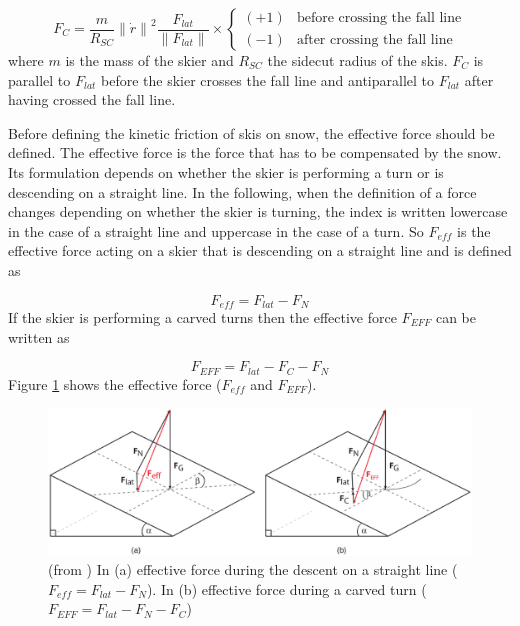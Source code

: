\documentclass[12pt,a4paper,twoside]{book}
\newcommand{\norm}[1]{\lVert#1\rVert}
\begin{document}
\begin{equation}
F_C=\frac{m}{R_{SC}} {\norm{\dot{r}}}^2 \frac{F_{lat}}{\norm{F_{lat}}} \times
\begin{cases}
  (+1) & \text{before crossing the fall line} \\
  (-1) & \text{after crossing the fall line}
  \end{cases}
\end{equation}
where $m$ is the mass of the skier and $R_{SC}$ the sidecut radius of the skis. $F_C$ is parallel to $F_{lat}$ before the skier crosses the fall line and antiparallel to $F_{lat}$ after having crossed the fall line.

Before defining the kinetic friction of skis on snow, the effective force should be defined. The effective force is the force that has to be compensated by the snow. Its formulation depends on whether the skier is performing a turn or is descending on a straight line. In the following, when the definition of a force changes depending on whether the skier is turning, the index is written lowercase in the case of a straight line and uppercase in the case of a turn. So $F_{eff}$ is the effective force acting on a skier that is descending on a straight line and is defined as

\begin{equation}
F_{eff}=F_{lat}-F_N
\end{equation}
If the skier is performing a carved turns then the effective force $F_{EFF}$ can be written as

\begin{equation}
F_{EFF}=F_{lat}-F_C-F_N
\end{equation}
Figure \ref{effective_force_pic} shows the effective force ($F_{eff}$ and $F_{EFF}$).

\begin{figure}[!ht]
  \begin{center}
    \includegraphics[width=\textwidth]{images/figure6.eps}
    \caption{(from \cite{hol2012}) In (a) effective force during the descent on a straight line ($F_{eff}=F_{lat}-F_N$). In (b) effective force during a carved turn ($F_{EFF}=F_{lat}-F_N-F_C$)}\label{effective_force_pic}
  \end{center}
\end{figure}
\end{document}
